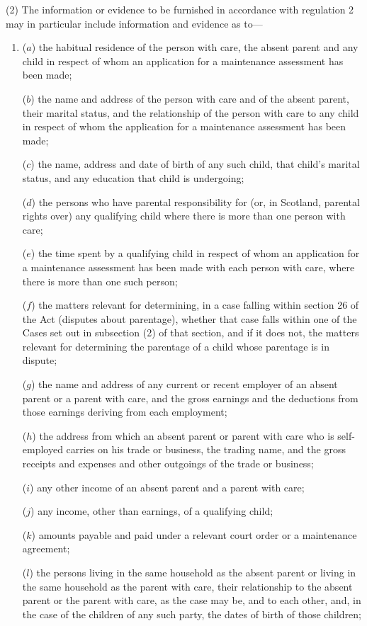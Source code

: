 \documentclass[a4paper]{article}
\begin{document}
(2) The information or evidence to be furnished in accordance with regulation 2 may in particular include information and evidence as to—
\begin{enumerate}\item[]
($a$) the habitual residence of the person with care, the absent parent and any child in respect of whom an application for a maintenance assessment has been made;

($b$) the name and address of the person with care and of the absent parent, their marital status, and the relationship of the person with care to any child in respect of whom the application for a maintenance assessment has been made;

($c$) the name, address and date of birth of any such child, that child’s marital status, and any education that child is undergoing;

($d$) the persons who have parental responsibility for (or, in Scotland, parental rights over) any qualifying child where there is more than one person with care;

($e$) the time spent by a qualifying child in respect of whom an application for a maintenance assessment has been made with each person with care, where there is more than one such person;

($f$) the matters relevant for determining, in a case falling within section 26 of the Act (disputes about parentage), whether that case falls within one of the Cases set out in subsection (2) of that section, and if it does not, the matters relevant for determining the parentage of a child whose parentage is in dispute;

($g$) the name and address of any current or recent employer of an absent parent or a parent with care, and the gross earnings and the deductions from those earnings deriving from each employment;

($h$) the address from which an absent parent or parent with care who is self-employed carries on his trade or business, the trading name, and the gross receipts and expenses and other outgoings of the trade or business;

($i$) any other income of an absent parent and a parent with care;

($j$) any income, other than earnings, of a qualifying child;

($k$) amounts payable and paid under a relevant court order or a maintenance agreement;

($l$) the persons living in the same household as the absent parent or living in the same household as the parent with care, their relationship to the absent parent or the parent with care, as the case may be, and to each other, and, in the case of the children of any such party, the dates of birth of those children;


\end{enumerate}
\end{document}
